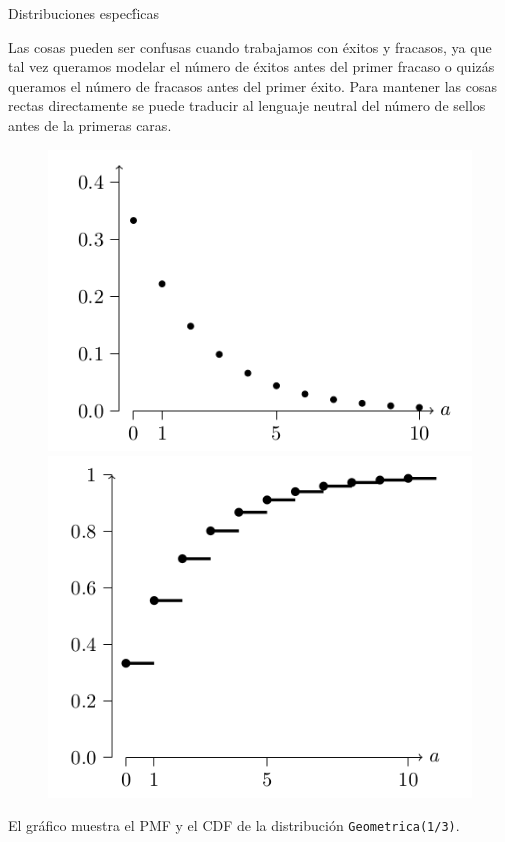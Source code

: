 \documentclass[10pt]{beamer}
\begin{document}
\begin{frame}{Distribuciones espec\'ficas}
\small{Las cosas pueden ser confusas cuando trabajamos con \'exitos y fracasos, ya que tal vez queramos modelar el n\'umero de \'exitos antes del primer fracaso o quiz\'as queramos el n\'umero de fracasos antes del primer \'exito. Para mantener las cosas rectas directamente se puede traducir al lenguaje neutral del n\'umero de sellos antes de la primeras caras.
		
\begin{figure}
	\centering
	\begin{minipage}{.5\textwidth}
		\centering
		\includegraphics[width=0.7\linewidth]{v16}
	\end{minipage}%
	\begin{minipage}{.5\textwidth}
		\centering
		\includegraphics[width=0.7\linewidth]{v17}
	\end{minipage}
\end{figure}

El gr\'afico muestra el PMF y el CDF de la distribuci\'on \texttt{Geometrica(1/3)}.	
}
\end{frame}
\end{document}
